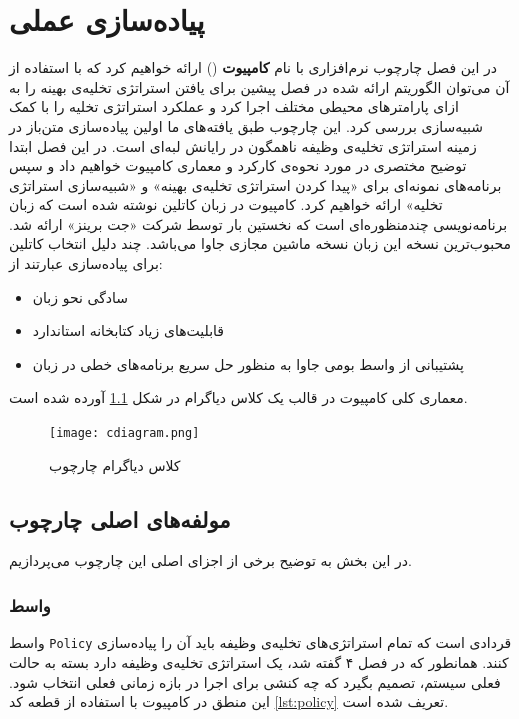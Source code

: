 \chapter{پیاده‌سازی عملی}
در این فصل چارچوب نرم‌افزاری با نام \textbf{کامپیوت} () ارائه خواهیم کرد که با استفاده از آن می‌توان الگوریتم ارائه شده در فصل پیشین برای یافتن استراتژی تخلیه‌ی بهینه را به ازای پارامترهای محیطی مختلف اجرا کرد و عملکرد استراتژی تخلیه را با کمک شبیه‌سازی بررسی کرد. این چارچوب طبق یافته‌های ما اولین پیاده‌سازی متن‌باز در زمینه استراتژی تخلیه‌ی وظیفه ناهمگون در رایانش لبه‌ای است. در این فصل ابتدا توضیح مختصری در مورد نحوه‌ی کارکرد و معماری کامپیوت خواهیم داد و سپس برنامه‌های نمونه‌ای برای «پیدا کردن استراتژی تخلیه‌ی بهینه» و «شبیه‌سازی استراتژی تخلیه» ارائه خواهیم کرد. کامپیوت در زبان کاتلین نوشته شده است که زبان برنامه‌نویسی چندمنظوره‌ای است که نخستین بار توسط شرکت «جت برینز» ارائه شد. محبوب‌ترین نسخه این زبان نسخه ماشین مجازی جاوا می‌باشد. چند دلیل انتخاب کاتلین برای پیاده‌سازی \CurrentProject عبارتند از:
\begin{itemize}
	\item سادگی نحو زبان
	\item قابلیت‌های زیاد کتابخانه استاندارد
	\item پشتیبانی از واسط بومی جاوا به منظور حل سریع برنامه‌های خطی در زبان 
\end{itemize}
معماری کلی کامپیوت در قالب یک کلاس دیاگرام در شکل \ref{fig:classdiagram} آورده شده است. 
\begin{figure}[H]
	\centering
	\texttt{[image: cdiagram.png]}
	\caption{کلاس دیاگرام چارچوب }
	\label{fig:classdiagram}
\end{figure}
\section{مولفه‌های اصلی چارچوب }
در این بخش به توضیح برخی از اجزای اصلی این چارچوب می‌پردازیم.
\subsection{واسط }
واسط \texttt{\footnotesize Policy} قردادی است که تمام استراتژی‌های تخلیه‌ی وظیفه باید آن را پیاده‌سازی کنند. همانطور که در فصل ۴ گفته شد، یک استراتژی تخلیه‌ی وظیفه دارد بسته به حالت فعلی سیستم، تصمیم بگیرد که چه کنشی برای اجرا در بازه زمانی فعلی انتخاب شود. این منطق در کامپیوت با استفاده از قطعه کد \ref{lst:policy} تعریف شده است.


